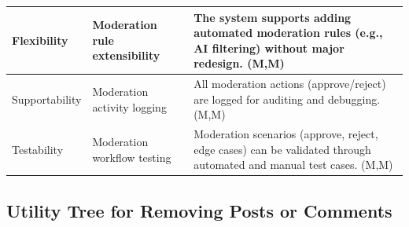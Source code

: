 \documentclass{article}
\begin{document}
\begin{table}[H]
\begin{tabular}{|p{3cm}|p{4cm}|p{7cm}|}
Flexibility
& Moderation rule extensibility
& The system supports adding automated moderation rules (e.g., AI filtering) without major redesign. (M,M) \\
\hline

Supportability
& Moderation activity logging
& All moderation actions (approve/reject) are logged for auditing and debugging. (M,M) \\
\hline

Testability
& Moderation workflow testing
& Moderation scenarios (approve, reject, edge cases) can be validated through automated and manual test cases. (M,M) \\
\hline

\end{tabular}
\end{table}

\subsection{Utility Tree for Removing Posts or Comments}
\end{document}

